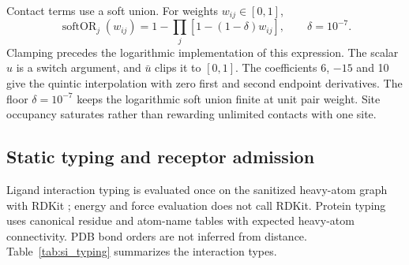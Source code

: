 \documentclass{article}
\newcommand{\citep}[1]{\cite{#1}}
\begin{document}
Contact terms use a soft union.
For weights \(w_{ij}\in[0,1]\),
\begin{equation}
    \operatorname{softOR}_j(w_{ij})
    =
    1-\prod_j[1-(1-\delta)w_{ij}],
    \qquad \delta=10^{-7}.
    \label{eq:si_soft_or}
\end{equation}
Clamping precedes the logarithmic implementation of this expression.
The scalar \(u\) is a switch argument, and \(\bar u\) clips it to \([0,1]\). The coefficients 6, \(-15\) and 10 give the quintic interpolation with zero first and second endpoint derivatives. The floor \(\delta=10^{-7}\) keeps the logarithmic soft union finite at unit pair weight. Site occupancy saturates rather than rewarding unlimited contacts with one site.

\subsection{Static typing and receptor admission}
\label{si:guidance_typing}

Ligand interaction typing is evaluated once on the sanitized heavy-atom graph with RDKit \citep{landrum2024rdkit}; energy and force evaluation does not call RDKit.
Protein typing uses canonical residue and atom-name tables with expected heavy-atom connectivity.
PDB bond orders are not inferred from distance.
Table~\ref{tab:si_typing} summarizes the interaction types.
\end{document}
